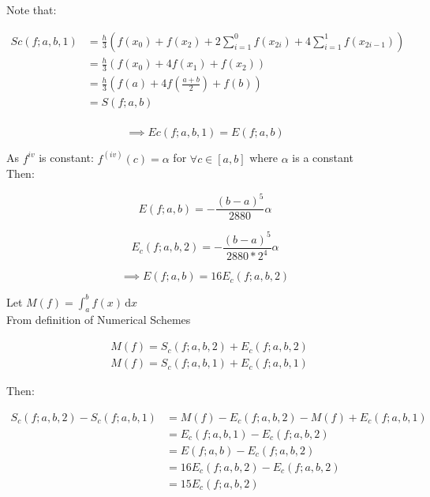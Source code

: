 \documentclass[fleqn]{report}
\begin{document}
\noindent Note that:

\begin{equation*}
\begin{split}
Sc(f;a,b,1) &= \frac{h}{3} (f(x_0) + f(x_{2}) +  2\sum_{i=1}^{0} f(x_{2i}) + 4\sum_{i=1}^{1} f(x_{2i-1}))\\
            & = \frac{h}{3} (f(x_0) + 4f(x_1) + f(x_2))\\
            & = \frac{h}{3} (f(a) + 4f(\frac{a + b}{2}) + f(b))\\
            & = S(f;a,b)\\
\end{split}
\end{equation*}

\begin{equation*}
\implies Ec(f;a,b,1) = E(f;a,b)
\end{equation*}


\noindent As $f^{iv}$ is constant: $f^{(iv)}(c) = \alpha$ for $ \forall c \in [a,b]$ 
where $\alpha$ is a constant\\ 
Then:

\begin{equation*}
E(f;a,b) = -\frac{(b - a)^5}{2880}\alpha
\end{equation*}

\begin{equation*}
E_c(f;a,b,2) = -\frac{(b - a)^5}{2880 * 2^4}\alpha
\end{equation*}

\begin{equation*}
\implies E(f;a,b) = 16E_c(f;a,b,2)
\end{equation*}


\noindent Let $M(f) = \int_a^b \! f(x) \, \mathrm{d}x$ \\

From definition of Numerical Schemes

\begin{equation*}
\begin{split}
&M(f) = S_c(f;a,b,2) + E_c(f;a,b,2)\\
&M(f) = S_c(f;a,b,1) + E_c(f;a,b,1)
\end{split}
\end{equation*}


Then:

\begin{equation*}
\begin{split}
S_c(f;a,b,2) - S_c(f;a,b,1) & = M(f) - E_c(f;a,b,2) - M(f) + E_c(f;a,b,1)\\
& = E_c(f;a,b,1) - E_c(f;a,b,2)\\
& = E(f;a,b) - E_c(f;a,b,2)\\
& = 16E_c(f;a,b,2) - E_c(f;a,b,2)\\
& = 15E_c(f;a,b,2)\\
\end{split}
\end{equation*}
\end{document}
